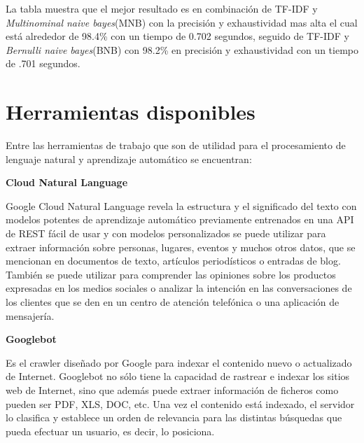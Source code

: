 La tabla muestra que el mejor resultado es en combinación de TF-IDF y  \textit{Multinominal naive bayes}(MNB) con la precisión y exhaustividad mas alta el cual está alrededor de 98.4\% con un tiempo de 0.702 segundos, seguido de TF-IDF y \textit{Bernulli naive bayes}(BNB)  con 98.2\% en precisión y exhaustividad con un tiempo de .701 segundos.



\section[Herramientas d.]{Herramientas disponibles}


Entre las herramientas de trabajo que son de utilidad para el procesamiento de lenguaje natural y aprendizaje automático se encuentran:\\

\begin{large}
	 \textbf{Cloud Natural Language}\\
\end{large} 

Google Cloud Natural Language \cite{ocho} revela la estructura y el significado del texto con modelos potentes de aprendizaje automático previamente entrenados en una API de REST fácil de usar y con modelos personalizados se puede utilizar para extraer información sobre personas, lugares, eventos y muchos otros datos, que se mencionan en documentos de texto, artículos periodísticos o entradas de blog. También se puede utilizar para comprender las opiniones sobre los productos expresadas en los medios sociales o analizar la intención en las conversaciones de los clientes que se den en un centro de atención telefónica o una aplicación de mensajería.\\

\begin{large}
	 \textbf{Googlebot}\\
\end{large}

Es el crawler diseñado por Google para indexar el contenido nuevo o actualizado de Internet.
Googlebot\cite{nueve} no sólo tiene la capacidad de rastrear e indexar los sitios web de Internet, sino que además puede extraer información de ficheros como pueden ser PDF, XLS, DOC, etc.
Una vez el contenido está indexado, el servidor lo clasifica y establece un orden de relevancia para las distintas búsquedas que pueda efectuar un usuario, es decir, lo posiciona.\\



